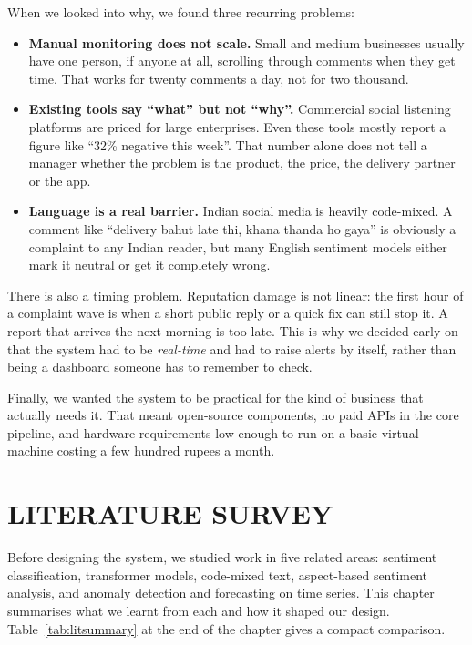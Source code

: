 \documentclass[12pt,a4paper]{report}
\begin{document}
When we looked into why, we found three recurring problems:

\begin{itemize}
    \item \textbf{Manual monitoring does not scale.} Small and medium businesses usually have one person, if anyone at all, scrolling through comments when they get time. That works for twenty comments a day, not for two thousand.
    \item \textbf{Existing tools say ``what'' but not ``why''.} Commercial social listening platforms are priced for large enterprises. Even these tools mostly report a figure like ``32\% negative this week''. That number alone does not tell a manager whether the problem is the product, the price, the delivery partner or the app.
    \item \textbf{Language is a real barrier.} Indian social media is heavily code-mixed. A comment like ``delivery bahut late thi, khana thanda ho gaya'' is obviously a complaint to any Indian reader, but many English sentiment models either mark it neutral or get it completely wrong.
\end{itemize}

There is also a timing problem. Reputation damage is not linear: the first hour of a complaint wave is when a short public reply or a quick fix can still stop it. A report that arrives the next morning is too late. This is why we decided early on that the system had to be \textit{real-time} and had to raise alerts by itself, rather than being a dashboard someone has to remember to check.

Finally, we wanted the system to be practical for the kind of business that actually needs it. That meant open-source components, no paid APIs in the core pipeline, and hardware requirements low enough to run on a basic virtual machine costing a few hundred rupees a month.

\chapter{LITERATURE SURVEY}

Before designing the system, we studied work in five related areas: sentiment classification, transformer models, code-mixed text, aspect-based sentiment analysis, and anomaly detection and forecasting on time series. This chapter summarises what we learnt from each and how it shaped our design. Table~\ref{tab:litsummary} at the end of the chapter gives a compact comparison.
\end{document}
